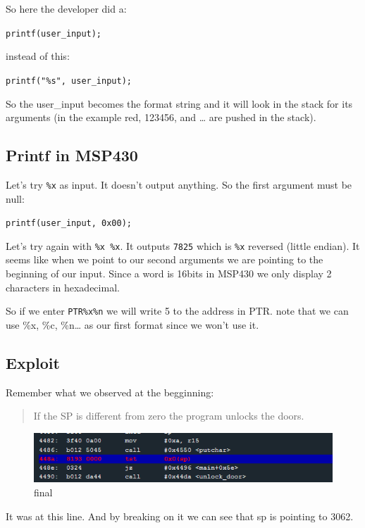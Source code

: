 \documentclass[a4paper,11pt]{article}
\begin{document}
So here the developer did a:

\texttt{printf(user\_input);}

instead of this:

\texttt{printf("\%s", user\_input);}

So the user\_input becomes the format string and it will look in the
stack for its arguments (in the example red, 123456, and \ldots{} are
pushed in the stack).

\subsection{Printf in MSP430}\label{printf-in-msp430}

Let's try \texttt{\%x} as input. It doesn't output anything. So the
first argument must be null:

\texttt{printf(user\_input, 0x00);}

Let's try again with \texttt{\%x \%x}. It outputs \texttt{7825} which is
\texttt{\%x} reversed (little endian). It seems like when we point to
our second arguments we are pointing to the beginning of our input.
Since a word is 16bits in MSP430 we only display 2 characters in
hexadecimal.

So if we enter \texttt{PTR\%x\%n} we will write 5 to the address in PTR.
note that we can use \%x, \%c, \%n\ldots{} as our first format since we
won't use it.

\subsection{Exploit}\label{exploit}

Remember what we observed at the begginning:

\begin{quote}
If the SP is different from zero the program unlocks the doors.
\end{quote}

\begin{figure}[htbp]
\centering
\includegraphics{img/12_5.PNG}
\caption{final}
\end{figure}

It was at this line. And by breaking on it we can see that sp is
pointing to 3062.
\end{document}
